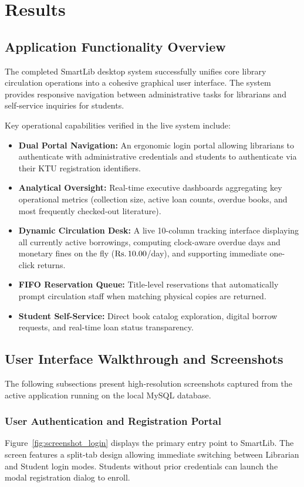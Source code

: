 \chapter{Results}

\section{Application Functionality Overview}
The completed SmartLib desktop system successfully unifies core library circulation operations into a cohesive graphical user interface. The system provides responsive navigation between administrative tasks for librarians and self-service inquiries for students.

Key operational capabilities verified in the live system include:
\begin{itemize}
    \item \textbf{Dual Portal Navigation:} An ergonomic login portal allowing librarians to authenticate with administrative credentials and students to authenticate via their KTU registration identifiers.
    \item \textbf{Analytical Oversight:} Real-time executive dashboards aggregating key operational metrics (collection size, active loan counts, overdue books, and most frequently checked-out literature).
    \item \textbf{Dynamic Circulation Desk:} A live 10-column tracking interface displaying all currently active borrowings, computing clock-aware overdue days and monetary fines on the fly ($\text{\text{Rs.\,}} 10.00$/day), and supporting immediate one-click returns.
    \item \textbf{FIFO Reservation Queue:} Title-level reservations that automatically prompt circulation staff when matching physical copies are returned.
    \item \textbf{Student Self-Service:} Direct book catalog exploration, digital borrow requests, and real-time loan status transparency.
\end{itemize}

\section{User Interface Walkthrough and Screenshots}

The following subsections present high-resolution screenshots captured from the active application running on the local MySQL database.

\subsection{User Authentication and Registration Portal}
Figure~\ref{fig:screenshot_login} displays the primary entry point to SmartLib. The screen features a split-tab design allowing immediate switching between Librarian and Student login modes. Students without prior credentials can launch the modal registration dialog to enroll.

